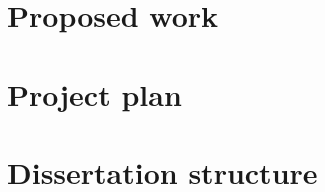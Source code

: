 \documentclass[proposal]{softeng}
\begin{document}
\section{Proposed work}


\section{Project plan}


\section{Dissertation structure}


\nocite{*}


\end{document}
